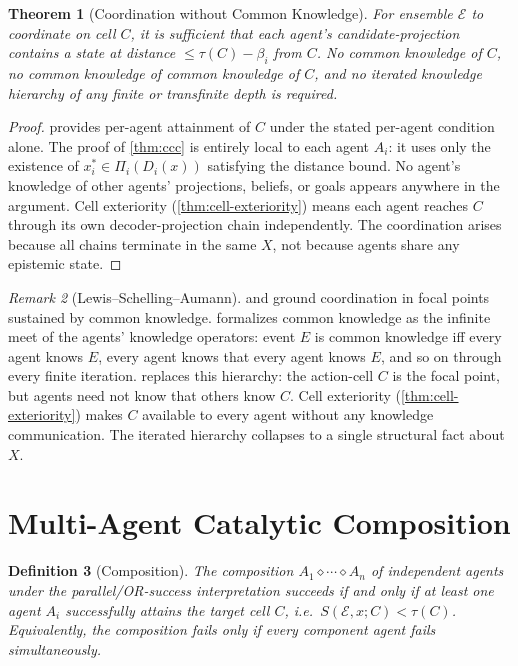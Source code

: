 \documentclass[twocolumn,11pt,a4paper]{article}
\newtheorem{theorem}{Theorem}[section]
\newtheorem{definition}[theorem]{Definition}
\theoremstyle{remark}
\newtheorem{remark}[theorem]{Remark}
\newcommand{\tol}{\tau}
\newcommand{\Compose}{\diamond}           %
\newcommand{\Ens}{\mathcal{E}}            %
\begin{document}
\begin{theorem}[Coordination without Common Knowledge]
\label{thm:no-ck}
For ensemble $\Ens$ to coordinate on cell $C$, it is sufficient that each
agent's candidate-projection contains a state at distance $\le \tol(C) -
\beta_i$ from $C$.  No common knowledge of $C$, no common knowledge of
common knowledge of $C$, and no iterated knowledge hierarchy of any finite
or transfinite depth is required.
\end{theorem}
\begin{proof}
 provides per-agent attainment of $C$ under the stated
per-agent condition alone.  The proof of \cref{thm:ccc} is entirely
local to each agent $A_i$: it uses only the existence of $x_i^* \in
\Pi_i(D_i(x))$ satisfying the distance bound.  No agent's knowledge of
other agents' projections, beliefs, or goals appears anywhere in the
argument.  Cell exteriority (\cref{thm:cell-exteriority}) means each
agent reaches $C$ through its own decoder-projection chain independently.
The coordination arises because all chains terminate in the same $X$, not
because agents share any epistemic state.
\end{proof}

\begin{remark}[Lewis--Schelling--Aumann]
\label{rem:lsa}
\citet{lewis1969} and \citet{schelling1960} ground coordination in focal
points sustained by common knowledge.  \citet{aumann1976} formalizes common
knowledge as the infinite meet of the agents' knowledge operators: event $E$
is common knowledge iff every agent knows $E$, every agent knows that every
agent knows $E$, and so on through every finite iteration.
 replaces this hierarchy: the action-cell $C$ is the focal
point, but agents need not know that others know $C$.  Cell exteriority
(\cref{thm:cell-exteriority}) makes $C$ available to every agent without any
knowledge communication.  The iterated hierarchy collapses to a single
structural fact about $X$.
\end{remark}

\section{Multi-Agent Catalytic Composition}
\label{sec:composition}

\begin{definition}[Composition]
\label{def:composition}
The \emph{composition} $A_1 \Compose \cdots \Compose A_n$ of independent
agents under the \emph{parallel/OR-success} interpretation succeeds if and
only if at least one agent $A_i$ successfully attains the target cell $C$,
i.e.\ $S(\Ens, x; C) < \tol(C)$.  Equivalently, the composition fails only
if every component agent fails simultaneously.
\end{definition}
\end{document}
